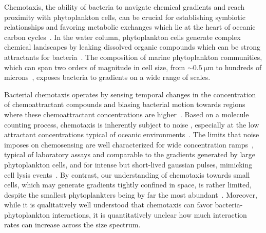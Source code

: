\documentclass[9pt,twocolumn,twoside]{pnas-new}
\begin{document}
Chemotaxis, the ability of bacteria to navigate chemical gradients and reach proximity with phytoplankton cells, can be crucial for establishing symbiotic relationships and favoring metabolic exchanges which lie at the heart of oceanic carbon cycles~\cite{azam1998microbial,raina2019role,raina2022chemotaxis}.
In the water column, phytoplankton cells generate complex chemical landscapes by leaking dissolved organic compounds which can be strong attractants for bacteria~\cite{thornton2014dissolved,smriga2016chemotaxis,seymour2017zooming}.
The composition of marine phytoplankton communities, which can span two orders of magnitude in cell size, from $\sim\SI{0.5}{\micro\m}$ to hundreds of microns~\cite{sieburth1978pelagic}, exposes bacteria to gradients on a wide range of scales.

Bacterial chemotaxis operates by sensing temporal changes in the concentration of chemoattractant compounds and biasing bacterial motion towards regions where these chemoattractant concentrations are higher~\cite{macnab1972gradientsensing,brown1974temporal}. Based on a molecule counting process, chemotaxis is inherently subject to noise \cite{berg1977physics,tenwolde2016fundamental}, especially at the low attractant concentrations typical of oceanic environments~\cite{lee1975amino}.
The limits that noise imposes on chemosensing are well characterized for wide concentration ramps~\cite{mora2010limits}, typical of laboratory assays and comparable to the gradients generated by large phytoplankton cells, and for intense but short-lived gaussian pulses, mimicking cell lysis events~\cite{hein2016physical,brumley2019bacteria}.
By contrast, our understanding of chemotaxis towards small cells, which may generate gradients tightly confined in space, is rather limited, despite the smallest phytoplankters being by far the most abundant~\cite{sprules1986plankton,cermeno2008species}. Moreover, while it is qualitatively well understood that chemotaxis can favor bacteria-phytoplankton interactions, it is quantitatively unclear how much interaction rates can increase across the size spectrum.
\end{document}
